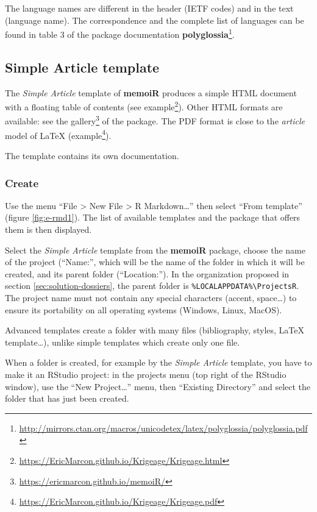 \documentclass[
  12pt,
  american,
  a4paper,
  extrafontsizes,onecolumn,openright
  ]{memoir}
\begin{document}
The language names are different in the header (IETF codes) and in the text (language name).
The correspondence and the complete list of languages can be found in table 3 of the package documentation \textbf{polyglossia}\footnote{\url{http://mirrors.ctan.org/macros/unicodetex/latex/polyglossia/polyglossia.pdf}}.

\hypertarget{sec:memo}{%
\subsection{Simple Article template}\label{sec:memo}}

The \emph{Simple Article} template of \textbf{memoiR} produces a simple HTML document with a floating table of contents (see example\footnote{\url{https://EricMarcon.github.io/Krigeage/Krigeage.html}}).
Other HTML formats are available: see the gallery\footnote{\url{https://ericmarcon.github.io/memoiR/}} of the package.
The PDF format is close to the \emph{article} model of LaTeX (example\footnote{\url{https://EricMarcon.github.io/Krigeage/Krigeage.pdf}}).

The template contains its own documentation.

\hypertarget{create}{%
\subsubsection{Create}\label{create}}

Use the menu \enquote{File \textgreater{} New File \textgreater{} R Markdown\ldots{}} then select \enquote{From template} (figure \ref{fig:e-rmd1}).
The list of available templates and the package that offers them is then displayed.

Select the \emph{Simple Article} template from the \textbf{memoiR} package, choose the name of the project (\enquote{Name:}, which will be the name of the folder in which it will be created, and its parent folder (\enquote{Location:}).
In the organization proposed in section \ref{sec:solution-dossiers}, the parent folder is \texttt{\%LOCALAPPDATA\%\textbackslash{}ProjectsR}.
The project name must not contain any special characters (accent, space\ldots) to ensure its portability on all operating systems (Windows, Linux, MacOS).

Advanced templates create a folder with many files (bibliography, styles, LaTeX template\ldots), unlike simple templates which create only one file.

When a folder is created, for example by the \emph{Simple Article} template, you have to make it an RStudio project: in the projects menu (top right of the RStudio window), use the \enquote{New Project\ldots{}} menu, then \enquote{Existing Directory} and select the folder that has just been created.
\end{document}
